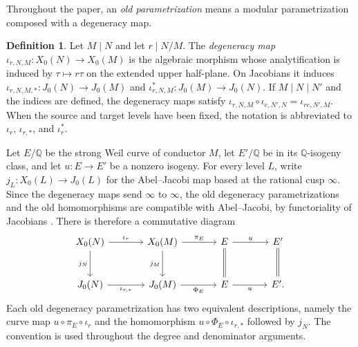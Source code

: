 \documentclass[12pt, letterpaper]{amsart}
\theoremstyle{definition}
\newtheorem{definition}[theorem]{Definition}
\theoremstyle{remark}
\newcommand{\Q}{\mathbb Q}
\numberwithin{equation}{section}
\begin{document}
Throughout the paper, an \emph{old parametrization} means a modular
parametrization composed with a degeneracy map.

\begin{definition}\label{def:degeneracy}
Let \(M\mid N\) and let \(r\mid N/M\). The \emph{degeneracy map}
\(\iota_{r,N,M}:X_0(N)\to X_0(M)\) is the algebraic morphism whose analytification is induced by
\(\tau\mapsto r\tau\) on the extended upper half-plane. On Jacobians it induces
\(\iota_{r,N,M,*}:J_0(N)\to J_0(M)\) and
\(\iota_{r,N,M}^{*}:J_0(M)\to J_0(N)\).
If $M\mid N\mid N'$ and the indices are defined, the degeneracy maps satisfy
\(\iota_{r,N,M}\circ \iota_{e,N',N}=\iota_{re,N',M}\).
When the source and target levels have been fixed, the notation is abbreviated to
\(\iota_r\), \(\iota_{r,*}\), and \(\iota_r^*\).
\end{definition}

Let \(E/\Q\) be the strong Weil curve of conductor \(M\), let \(E'/\Q\) be in
its \(\Q\)-isogeny class, and let \(u:E\to E'\) be a nonzero isogeny.
For every level \(L\), write \(j_L:X_0(L)\to J_0(L)\) for the
Abel--Jacobi map based at the rational cusp \(\infty\).
Since the degeneracy maps send \(\infty\) to \(\infty\), the old degeneracy
parametrizations and the old homomorphisms are compatible with Abel--Jacobi, by
functoriality of Jacobians \cite{MilneJacobians}. There is therefore a commutative
diagram
\[
\begin{tikzcd}[column sep=large,row sep=large]
X_0(N) \arrow[r,"\iota_r"] \arrow[d,"j_N"'] &
X_0(M) \arrow[r,"\pi_E"] \arrow[d,"j_M"'] &
E \arrow[r,"u"] \arrow[d,equal] &
E' \arrow[d,equal] \\
J_0(N) \arrow[r,"\iota_{r,*}"'] &
J_0(M) \arrow[r,"\Phi_E"'] &
E \arrow[r,"u"'] &
E' .
\end{tikzcd}
\]
Each old degeneracy parametrization has two equivalent descriptions, namely the
curve map \(u\circ\pi_E\circ\iota_r\) and the homomorphism
\(u\circ\Phi_E\circ\iota_{r,*}\) followed by \(j_N\). The convention is used
throughout the degree and denominator arguments.
\end{document}
